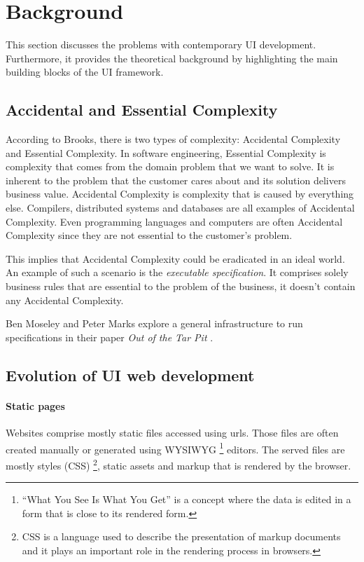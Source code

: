 \section{Background}\label{background}
This section discusses the problems with contemporary UI development. Furthermore, it provides the theoretical background by highlighting the main building blocks of the UI framework.

\subsection{Accidental and Essential Complexity}
According to Brooks, there is two types of complexity: Accidental Complexity and Essential Complexity. \citep{nosilverbullet}
In software engineering, Essential Complexity is complexity that comes from the domain problem that we want to solve. It is inherent to the problem that the customer cares about and its solution delivers business value. Accidental Complexity is complexity that is caused by everything else. Compilers, distributed systems and databases are all examples of Accidental Complexity. Even programming languages and computers are often Accidental Complexity since they are not essential to the customer's problem.

This implies that Accidental Complexity could be eradicated in an ideal world. An example of such a scenario is the \textit{executable specification}. It comprises solely business rules that are essential to the problem of the business, it doesn't contain any Accidental Complexity.

Ben Moseley and Peter Marks explore a general infrastructure to run specifications in their paper \textit{Out of the Tar Pit} \citep{outoftarpit}.

\subsection{Evolution of UI web development}\label{history}

\paragraph{Static pages} Websites comprise mostly static files accessed using \gls{url}s. Those files are often created manually or generated using WYSIWYG \footnote{``What You See Is What You Get'' is a concept where the data is edited in a form that is close to its rendered form.} editors. The served files are mostly styles (CSS) \footnote{CSS is a language used to describe the presentation of markup documents and it plays an important role in the rendering process in browsers.}, static assets and markup that is rendered by the browser.

